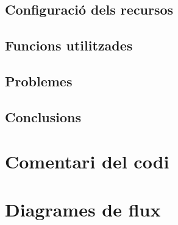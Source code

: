 \documentclass{../pdae} %
\begin{document}
\subsection{Configuració dels recursos}

\subsection{Funcions utilitzades}

\subsection{Problemes}

\subsection{Conclusions}

\section{Comentari del codi}

\section{Diagrames de flux}
\end{document}
